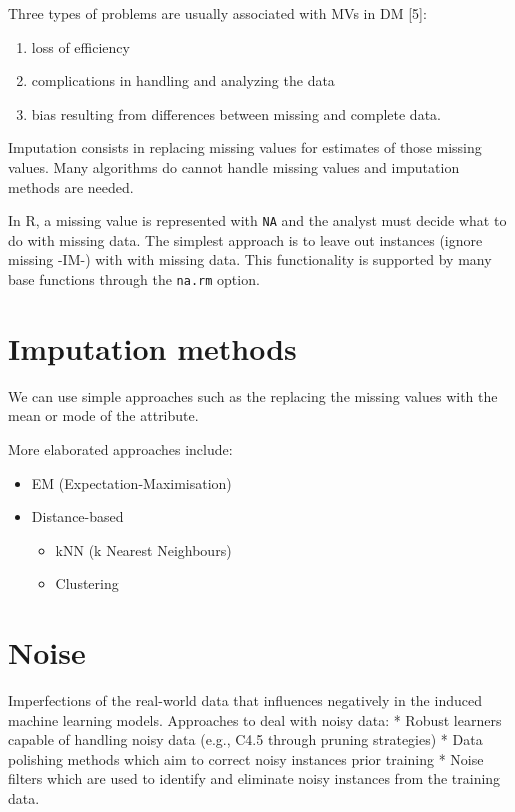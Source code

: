 \documentclass[]{book}
\providecommand{\tightlist}{%
  \setlength{\itemsep}{0pt}\setlength{\parskip}{0pt}}
\begin{document}
Three types of problems are usually associated with MVs in DM {[}5{]}:

\begin{enumerate}
\def\labelenumi{\arabic{enumi}.}
\tightlist
\item
  loss of efficiency
\item
  complications in handling and analyzing the data
\item
  bias resulting from differences between missing and complete data.
\end{enumerate}

Imputation consists in replacing missing values for estimates of those
missing values. Many algorithms do cannot handle missing values and
imputation methods are needed.

In R, a missing value is represented with \texttt{NA} and the analyst
must decide what to do with missing data. The simplest approach is to
leave out instances (ignore missing -IM-) with with missing data. This
functionality is supported by many base functions through the
\texttt{na.rm} option.

\section{Imputation methods}\label{imputation-methods}

We can use simple approaches such as the replacing the missing values
with the mean or mode of the attribute.

More elaborated approaches include:

\begin{itemize}
\tightlist
\item
  EM (Expectation-Maximisation)
\item
  Distance-based

  \begin{itemize}
  \tightlist
  \item
    kNN (k Nearest Neighbours)
  \item
    Clustering
  \end{itemize}
\end{itemize}

\section{Noise}\label{noise}

Imperfections of the real-world data that influences negatively in the
induced machine learning models. Approaches to deal with noisy data: *
Robust learners capable of handling noisy data (e.g., C4.5 through
pruning strategies) * Data polishing methods which aim to correct noisy
instances prior training * Noise filters which are used to identify and
eliminate noisy instances from the training data.
\end{document}
